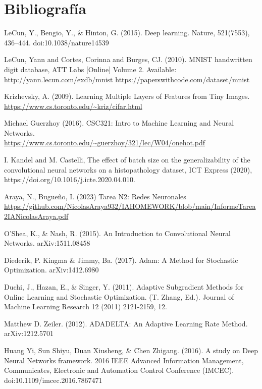 \documentclass[journal]{IEEEtai}
\begin{document}
\section*{Bibliografía}
\def\refname{}
\begin{thebibliography}{34}
	 LeCun, Y., Bengio, Y., \& Hinton, G. (2015). Deep learning. Nature, 521(7553), 436–444. doi:10.1038/nature14539 
	
	 LeCun, Yann and Cortes, Corinna and Burges, CJ. (2010). MNIST handwritten digit database, ATT Labs [Online] Volume 2. Available: \url{http://yann.lecun.com/exdb/mnist}
	\url{https://paperswithcode.com/dataset/mnist}
	
	 Krizhevsky, A. (2009). Learning Multiple Layers of Features from Tiny Images. \\ \url{https://www.cs.toronto.edu/~kriz/cifar.html}
	
	 Michael Guerzhoy (2016). CSC321: Intro to Machine Learning and Neural Networks. \\ \url{https://www.cs.toronto.edu/~guerzhoy/321/lec/W04/onehot.pdf}
	
	 I. Kandel and M. Castelli, The effect of batch size on the generalizability of the convolutional neural networks on a histopathology dataset, ICT Express (2020),
https://doi.org/10.1016/j.icte.2020.04.010.
	
	 Araya, N., Bugueño, I. (2023) Tarea N2: Redes Neuronales
\url{https://github.com/NicolasAraya932/IAHOMEWORK/blob/main/InformeTarea2IANicolasAraya.pdf}

	 O'Shea, K., \& Nash, R. (2015). An Introduction to Convolutional Neural Networks. arXiv:1511.08458
	
	 Diederik, P. Kingma \& Jimmy, Ba. (2017). Adam: A Method for Stochastic Optimization. arXiv:1412.6980
	
	 Duchi, J., Hazan, E., \& Singer, Y. (2011). Adaptive Subgradient Methods for Online Learning and Stochastic Optimization. (T. Zhang, Ed.). Journal of Machine Learning Research 12 (2011) 2121-2159, 12. 
	
	 Matthew D. Zeiler. (2012). ADADELTA: An Adaptive Learning Rate Method. arXiv:1212.5701
	
	 Huang Yi, Sun Shiyu, Duan Xiusheng, \& Chen Zhigang. (2016). A study on Deep Neural Networks framework. 2016 IEEE Advanced Information Management, Communicates, Electronic and Automation Control Conference (IMCEC). doi:10.1109/imcec.2016.7867471
\end{thebibliography}
\end{document}
